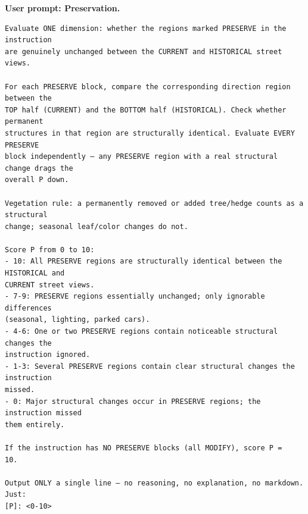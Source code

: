 \noindent\textbf{User prompt: Preservation.}\par
\begingroup\fontsize{8}{10}\selectfont
\begin{promptbox}
\begin{verbatim}
Evaluate ONE dimension: whether the regions marked PRESERVE in the instruction
are genuinely unchanged between the CURRENT and HISTORICAL street views.

For each PRESERVE block, compare the corresponding direction region between the
TOP half (CURRENT) and the BOTTOM half (HISTORICAL). Check whether permanent
structures in that region are structurally identical. Evaluate EVERY PRESERVE
block independently — any PRESERVE region with a real structural change drags the
overall P down.

Vegetation rule: a permanently removed or added tree/hedge counts as a structural
change; seasonal leaf/color changes do not.

Score P from 0 to 10:
- 10: All PRESERVE regions are structurally identical between the HISTORICAL and
CURRENT street views.
- 7-9: PRESERVE regions essentially unchanged; only ignorable differences
(seasonal, lighting, parked cars).
- 4-6: One or two PRESERVE regions contain noticeable structural changes the
instruction ignored.
- 1-3: Several PRESERVE regions contain clear structural changes the instruction
missed.
- 0: Major structural changes occur in PRESERVE regions; the instruction missed
them entirely.

If the instruction has NO PRESERVE blocks (all MODIFY), score P =
10.

Output ONLY a single line — no reasoning, no explanation, no markdown. Just:
[P]: <0-10>
\end{verbatim}
\end{promptbox}
\endgroup

\clearpage
